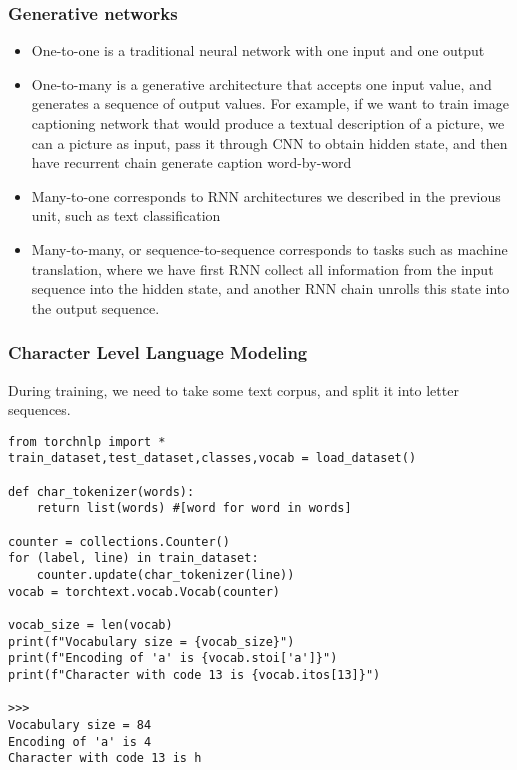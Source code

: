 \begin{frame}[fragile] \frametitle{Generative networks}

\begin{itemize}
\item One-to-one is a traditional neural network with one input and one output
\item One-to-many is a generative architecture that accepts one input value, and generates a sequence of output values. For example, if we want to train image captioning network that would produce a textual description of a picture, we can a picture as input, pass it through CNN to obtain hidden state, and then have recurrent chain generate caption word-by-word
\item Many-to-one corresponds to RNN architectures we described in the previous unit, such as text classification
\item Many-to-many, or sequence-to-sequence corresponds to tasks such as machine translation, where we have first RNN collect all information from the input sequence into the hidden state, and another RNN chain unrolls this state into the output sequence.
\end{itemize}

\end{frame}

\begin{frame}[fragile] \frametitle{Character Level Language Modeling}

During training, we need to take some text corpus, and split it into letter sequences.

\begin{lstlisting}
from torchnlp import *
train_dataset,test_dataset,classes,vocab = load_dataset()

def char_tokenizer(words):
    return list(words) #[word for word in words]

counter = collections.Counter()
for (label, line) in train_dataset:
    counter.update(char_tokenizer(line))
vocab = torchtext.vocab.Vocab(counter)

vocab_size = len(vocab)
print(f"Vocabulary size = {vocab_size}")
print(f"Encoding of 'a' is {vocab.stoi['a']}")
print(f"Character with code 13 is {vocab.itos[13]}")

>>>
Vocabulary size = 84
Encoding of 'a' is 4
Character with code 13 is h
\end{lstlisting}

\end{frame}

